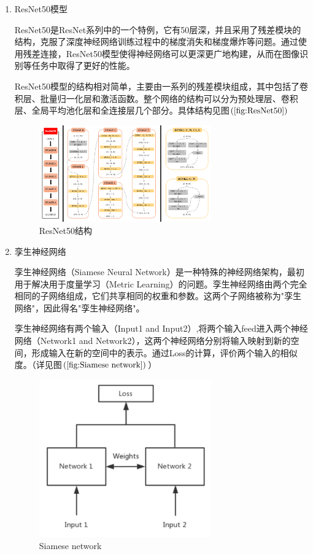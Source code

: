 \documentclass[UTF8]{ctexart}
\begin{document}
\begin{enumerate}
    \item ResNet50模型
  
    ResNet50是ResNet系列中的一个特例，它有50层深，并且采用了残差模块的结构，克服了深度神经网络训练过程中的梯度消失和梯度爆炸等问题。通过使用残差连接，ResNet50模型使得神经网络可以更深更广地构建，从而在图像识别等任务中取得了更好的性能。
  
    ResNet50模型的结构相对简单，主要由一系列的残差模块组成，其中包括了卷积层、批量归一化层和激活函数。整个网络的结构可以分为预处理层、卷积层、全局平均池化层和全连接层几个部分。具体结构见图$\left(\ref{fig:ResNet50}\right)$
    \begin{figure}[!ht]
      \centering
      \includegraphics[width=0.7\textwidth]{ResNet50.png}
      \caption{ResNet50结构}
      \label{fig:ResNet50}
    \end{figure}

    \item 孪生神经网络
    
    孪生神经网络（Siamese Neural Network）是一种特殊的神经网络架构，最初用于解决用于度量学习（Metric Learning）的问题。孪生神经网络由两个完全相同的子网络组成，它们共享相同的权重和参数。这两个子网络被称为"孪生网络"，因此得名"孪生神经网络"。
  
    孪生神经网络有两个输入（Input1 and Input2）,将两个输入feed进入两个神经网络（Network1 and Network2），这两个神经网络分别将输入映射到新的空间，形成输入在新的空间中的表示。通过Loss的计算，评价两个输入的相似度。（详见图$\left(\ref{fig:Siamese network}\right)$）
    \begin{figure}[!ht]
      \centering
      \includegraphics[width=0.7\textwidth]{Siamese network.png}
      \caption{Siamese network}
      \label{fig:Siamese network}
    \end{figure}
\end{enumerate}
\end{document}
